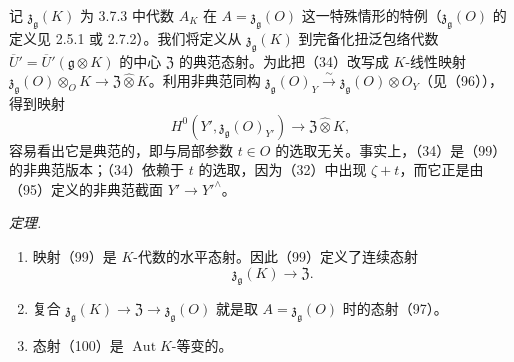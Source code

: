  记 $\mathfrak{z}_{\mathfrak{g}}(K)$ 为 3.7.3 中代数 $A_{K}$ 在 $A = \mathfrak{z}_{\mathfrak{g}}(O)$ 这一特殊情形的特例（$\mathfrak{z}_{\mathfrak{g}}(O)$ 的定义见 2.5.1 或 2.7.2）。我们将定义从 $\mathfrak{z}_{\mathfrak{g}}(K)$ 到完备化扭泛包络代数 $\overline{U}' = \overline{U}'(\mathfrak{g}\otimes K)$ 的中心 $\mathfrak{Z}$ 的典范态射。为此把（34）改写成 $K$-线性映射 $\mathfrak{z}_{\mathfrak{g}}(O)\otimes_{O}K \to \mathfrak{Z}\widehat{\otimes}K$。利用非典范同构 $\mathfrak{z}_{\mathfrak{g}}(O)_{Y} \xrightarrow{\sim} \mathfrak{z}_{\mathfrak{g}}(O)\otimes O_{Y}$（见（96）），得到映射
\begin{equation}\tag{99}
H^{0}(Y', \mathfrak{z}_{\mathfrak{g}}(O)_{Y'}) \to \mathfrak{Z}\widehat{\otimes}K,
\end{equation}
容易看出它是典范的，即与局部参数 $t \in O$ 的选取无关。事实上，（34）是（99）的非典范版本；（34）依赖于 $t$ 的选取，因为（32）中出现 $\zeta + t$，而它正是由（95）定义的非典范截面 $Y' \to Y'^{\wedge}$。

 \emph{定理.}
\begin{enumerate}[label=(\roman*),leftmargin=2.2em]
  \item 映射（99）是 $K$-代数的水平态射。因此（99）定义了连续态射
  \begin{equation}\tag{100}
  \mathfrak{z}_{\mathfrak{g}}(K) \to \mathfrak{Z}.
  \end{equation}
  \item 复合 $\mathfrak{z}_{\mathfrak{g}}(K) \to \mathfrak{Z} \to \mathfrak{z}_{\mathfrak{g}}(O)$ 就是取 $A = \mathfrak{z}_{\mathfrak{g}}(O)$ 时的态射（97）。
  \item 态射（100）是 $\operatorname{Aut} K$-等变的。
\end{enumerate}
